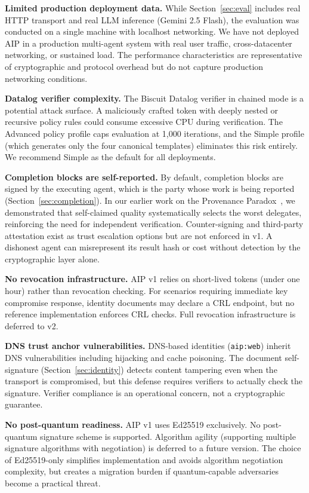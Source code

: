\documentclass[11pt,a4paper]{article}
\newcommand{\aip}{\textsc{AIP}}
\begin{document}
\textbf{Limited production deployment data.} While Section~\ref{sec:eval} includes real HTTP transport and real LLM inference (Gemini 2.5 Flash), the evaluation was conducted on a single machine with localhost networking. We have not deployed \aip{} in a production multi-agent system with real user traffic, cross-datacenter networking, or sustained load. The performance characteristics are representative of cryptographic and protocol overhead but do not capture production networking conditions.

\textbf{Datalog verifier complexity.} The Biscuit Datalog verifier in chained mode is a potential attack surface. A maliciously crafted token with deeply nested or recursive policy rules could consume excessive CPU during verification. The Advanced policy profile caps evaluation at 1,000 iterations, and the Simple profile (which generates only the four canonical templates) eliminates this risk entirely. We recommend Simple as the default for all deployments.

\textbf{Completion blocks are self-reported.} By default, completion blocks are signed by the executing agent, which is the party whose work is being reported (Section~\ref{sec:completion}). In our earlier work on the Provenance Paradox~\citep{prakash2025provenance}, we demonstrated that self-claimed quality systematically selects the worst delegates, reinforcing the need for independent verification. Counter-signing and third-party attestation exist as trust escalation options but are not enforced in v1. A dishonest agent can misrepresent its result hash or cost without detection by the cryptographic layer alone.

\textbf{No revocation infrastructure.} \aip{} v1 relies on short-lived tokens (under one hour) rather than revocation checking. For scenarios requiring immediate key compromise response, identity documents may declare a CRL endpoint, but no reference implementation enforces CRL checks. Full revocation infrastructure is deferred to v2.

\textbf{DNS trust anchor vulnerabilities.} DNS-based identities (\texttt{aip:web}) inherit DNS vulnerabilities including hijacking and cache poisoning. The document self-signature (Section~\ref{sec:identity}) detects content tampering even when the transport is compromised, but this defense requires verifiers to actually check the signature. Verifier compliance is an operational concern, not a cryptographic guarantee.

\textbf{No post-quantum readiness.} \aip{} v1 uses Ed25519 exclusively. No post-quantum signature scheme is supported. Algorithm agility (supporting multiple signature algorithms with negotiation) is deferred to a future version. The choice of Ed25519-only simplifies implementation and avoids algorithm negotiation complexity, but creates a migration burden if quantum-capable adversaries become a practical threat.
\end{document}
